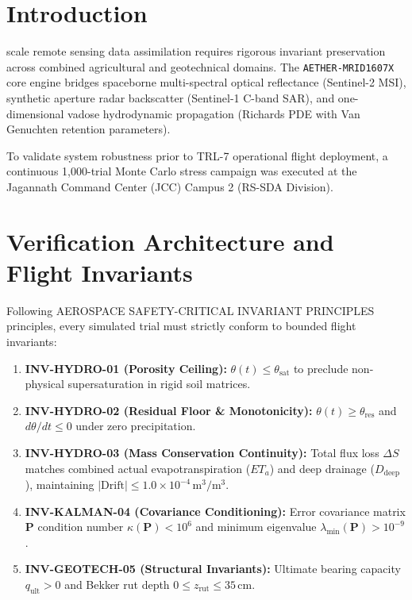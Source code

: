 \documentclass[10pt,journal,compsoc]{IEEEtran}
\begin{document}
\maketitle
\IEEEdisplaynontitleabstractindextext
\IEEEpeerreviewmaketitle

\section{Introduction}
 scale remote sensing data assimilation requires rigorous invariant preservation across combined agricultural and geotechnical domains. The \texttt{AETHER-MRID1607X} core engine bridges spaceborne multi-spectral optical reflectance (Sentinel-2 MSI), synthetic aperture radar backscatter (Sentinel-1 C-band SAR), and one-dimensional vadose hydrodynamic propagation (Richards PDE with Van Genuchten retention parameters).

To validate system robustness prior to TRL-7 operational flight deployment, a continuous 1,000-trial Monte Carlo stress campaign was executed at the Jagannath Command Center (JCC) Campus 2 (RS-SDA Division).

\section{Verification Architecture and Flight Invariants}
Following AEROSPACE SAFETY-CRITICAL INVARIANT PRINCIPLES principles, every simulated trial must strictly conform to bounded flight invariants:
\begin{enumerate}
    \item \textbf{INV-HYDRO-01 (Porosity Ceiling):} $\theta(t) \le \theta_{\text{sat}}$ to preclude non-physical supersaturation in rigid soil matrices.
    \item \textbf{INV-HYDRO-02 (Residual Floor \& Monotonicity):} $\theta(t) \ge \theta_{\text{res}}$ and $d\theta/dt \le 0$ under zero precipitation.
    \item \textbf{INV-HYDRO-03 (Mass Conservation Continuity):} Total flux loss $\Delta S$ matches combined actual evapotranspiration ($ET_a$) and deep drainage ($D_{\text{deep}}$), maintaining $| \text{Drift} | \le 1.0 \times 10^{-4}\,\text{m}^3/\text{m}^3$.
    \item \textbf{INV-KALMAN-04 (Covariance Conditioning):} Error covariance matrix $\mathbf{P}$ condition number $\kappa(\mathbf{P}) < 10^6$ and minimum eigenvalue $\lambda_{\min}(\mathbf{P}) > 10^{-9}$.
    \item \textbf{INV-GEOTECH-05 (Structural Invariants):} Ultimate bearing capacity $q_{\text{ult}} > 0$ and Bekker rut depth $0 \le z_{\text{rut}} \le 35\,\text{cm}$.
\end{enumerate}
\end{document}
